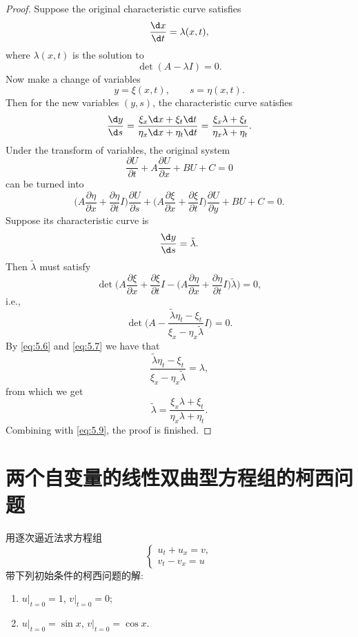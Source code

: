 \begin{proof}
  Suppose the original characteristic curve satisfies
  \[ \frac{\d x}{\d t} = \lambda(x,t), \]
  where $\lambda(x,t)$ is the solution to
  \begin{equation}\label{eq:5.6}
    \det(A-\lambda I) = 0.
  \end{equation}
  Now make a change of variables
  \[ y = \xi(x,t),\qquad s = \eta(x,t). \]
  Then for the new variables $(y,s)$, the characteristic curve satisfies
  \begin{equation}\label{eq:5.9}
    \frac{\d y}{\d s} = \frac{\xi_x \d x + \xi_t \d t}{\eta_x \d x + \eta_t \d t}
        = \frac{\xi_x \lambda + \xi_t}{\eta_x \lambda + \eta_t}.
  \end{equation}
  Under the transform of variables, the original system
  \[ \frac{\partial U}{\partial t} + A\frac{\partial U}{\partial x} + BU + C = 0 \]
  can be turned into
  \[ \biggl(A \frac{\partial\eta}{\partial x} + \frac{\partial\eta}{\partial t}I\biggr)
      \frac{\partial U}{\partial s}
      + \biggl(A \frac{\partial\xi}{\partial x} + \frac{\partial\xi}{\partial t}I\biggr)
        \frac{\partial U}{\partial y} + BU + C = 0. \]
  Suppose its characteristic curve is
  \[ \frac{\d y}{\d s} = \tilde\lambda. \] 
  Then $\tilde\lambda$ must satisfy
  \[\det\biggl(A \frac{\partial\xi}{\partial x} + \frac{\partial\xi}{\partial t}I
      - \biggl(A \frac{\partial\eta}{\partial x} + \frac{\partial\eta}{\partial t}I\biggr)\tilde\lambda\biggr) = 0,\]
  i.e.,
  \begin{equation}\label{eq:5.7}
    \det\biggl(A - \frac{\tilde\lambda \eta_t - \xi_t}{\xi_x - \eta_x \tilde\lambda}I\biggr) = 0.
  \end{equation}
  By \eqref{eq:5.6} and \eqref{eq:5.7} we have that
  \[ \frac{\tilde\lambda \eta_t - \xi_t}{\xi_x - \eta_x \tilde\lambda} = \lambda, \]
  from which we get
  \begin{equation}\label{eq:5.8}
    \tilde\lambda = \frac{\xi_x\lambda + \xi_t}{\eta_x\lambda + \eta_t}.
  \end{equation}
  Combining with \eqref{eq:5.9}, the proof is finished.
\end{proof}


\section{两个自变量的线性双曲型方程组的柯西问题}

\begin{exercise}
  用逐次逼近法求方程组
  \[\begin{cases}
    u_t + u_x = v, \\
    v_t - v_x = u
  \end{cases}\]
  带下列初始条件的柯西问题的解:
  \begin{enumerate}[(1)]
    \item $u|_{t=0}=1$, $v|_{t=0}=0$;
    \item $u|_{t=0}=\sin x$, $v|_{t=0}=\cos x$.
  \end{enumerate}
\end{exercise}

